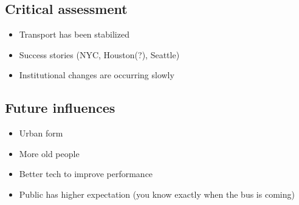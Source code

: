\documentclass[11pt]{article}
\begin{document}
\subsection{Critical assessment}
\label{sec:org3e62b57}
\begin{itemize}
\item Transport has been stabilized
\item Success stories (NYC, Houston(?), Seattle)
\item Institutional changes are occurring slowly
\end{itemize}
\subsection{Future influences}
\label{sec:org3271824}
\begin{itemize}
\item Urban form
\item More old people
\item Better tech to improve performance
\item Public has higher expectation (you know exactly when the bus is coming)
\end{itemize}
\end{document}
